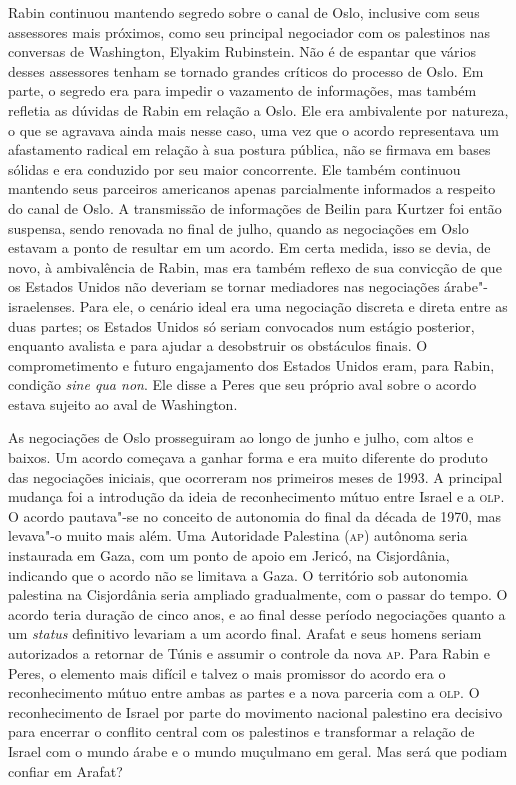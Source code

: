 Rabin continuou mantendo segredo sobre o canal de Oslo, inclusive com
seus assessores mais próximos, como seu principal negociador com os
palestinos nas conversas de Washington, Elyakim Rubinstein. Não é de
espantar que vários desses assessores tenham se tornado grandes críticos
do processo de Oslo. Em parte, o segredo era para impedir o vazamento de
informações, mas também refletia as dúvidas de Rabin em relação a Oslo.
Ele era ambivalente por natureza, o que se agravava ainda mais nesse
caso, uma vez que o acordo representava um afastamento radical em
relação à sua postura pública, não se firmava em bases sólidas e era
conduzido por seu maior concorrente. Ele também continuou mantendo seus
parceiros americanos apenas parcialmente informados a respeito do canal
de Oslo. A transmissão de informações de Beilin para Kurtzer foi então
suspensa, sendo renovada no final de julho, quando as negociações em
Oslo estavam a ponto de resultar em um acordo. Em certa medida, isso se
devia, de novo, à ambivalência de Rabin, mas era também reflexo de sua
convicção de que os Estados Unidos não deveriam se tornar mediadores nas
negociações árabe"-israelenses. Para ele, o cenário ideal era uma
negociação discreta e direta entre as duas partes; os Estados Unidos só
seriam convocados num estágio posterior, enquanto avalista e para
ajudar a desobstruir os obstáculos finais. O comprometimento e futuro
engajamento dos Estados Unidos eram, para Rabin, condição \textit{sine qua
non}. Ele disse a Peres que seu próprio aval sobre o acordo estava
sujeito ao aval de Washington.

As negociações de Oslo prosseguiram ao longo de junho e julho, com altos
e baixos. Um acordo começava a ganhar forma e era muito diferente do
produto das negociações iniciais, que ocorreram nos primeiros meses de
1993. A principal mudança foi a introdução da ideia de reconhecimento
mútuo entre Israel e a \textsc{olp}. O acordo pautava"-se no conceito de autonomia
do final da década de 1970, mas levava"-o muito mais além. Uma Autoridade
Palestina (\textsc{ap}) autônoma seria instaurada em Gaza, com um ponto de apoio
em Jericó, na Cisjordânia, indicando que o acordo não se limitava a
Gaza. O território sob autonomia palestina na Cisjordânia seria ampliado
gradualmente, com o passar do tempo. O acordo teria duração de cinco
anos, e ao final desse período negociações quanto a um \textit{status} definitivo
levariam a um acordo final. Arafat e seus homens seriam autorizados a
retornar de Túnis e assumir o controle da nova \textsc{ap}. Para Rabin e Peres, o
elemento mais difícil e talvez o mais promissor do acordo era o
reconhecimento mútuo entre ambas as partes e a nova parceria com a \textsc{olp}.
O reconhecimento de Israel por parte do movimento nacional palestino era
decisivo para encerrar o conflito central com os palestinos e
transformar a relação de Israel com o mundo árabe e o mundo muçulmano em
geral. Mas será que podiam confiar em Arafat?

